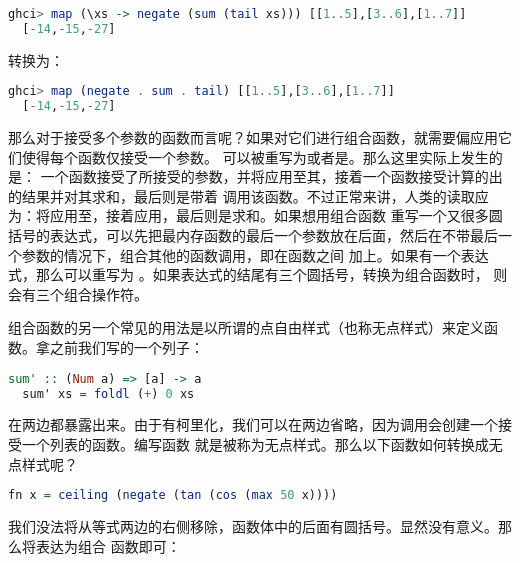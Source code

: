 \documentclass[./main.tex]{subfiles}
\begin{document}
\begin{lstlisting}[language=Haskell]
  ghci> map (\xs -> negate (sum (tail xs))) [[1..5],[3..6],[1..7]]
  [-14,-15,-27]
\end{lstlisting}

转换为：

\begin{lstlisting}[language=Haskell]
  ghci> map (negate . sum . tail) [[1..5],[3..6],[1..7]]
  [-14,-15,-27]
\end{lstlisting}

那么对于接受多个参数的函数而言呢？如果对它们进行组合函数，就需要偏应用它们使得每个函数仅接受一个参数。
可以被重写为或者是。那么这里实际上发生的是：
一个函数接受了所接受的参数，并将应用至其，接着一个函数接受计算的出的结果并对其求和，最后则是带着
调用该函数。不过正常来讲，人类的读取应为：将应用至，接着应用，最后则是求和。如果想用组合函数
重写一个又很多圆括号的表达式，可以先把最内存函数的最后一个参数放在\acode{\$}后面，然后在不带最后一个参数的情况下，组合其他的函数调用，即在函数之间
加上。如果有一个表达式，那么可以重写为
。如果表达式的结尾有三个圆括号，转换为组合函数时，
则会有三个组合操作符。

组合函数的另一个常见的用法是以所谓的点自由样式（也称无点样式）来定义函数。拿之前我们写的一个列子：

\begin{lstlisting}[language=Haskell]
  sum' :: (Num a) => [a] -> a
  sum' xs = foldl (+) 0 xs
\end{lstlisting}

在两边都暴露出来。由于有柯里化，我们可以在两边省略，因为调用会创建一个接受一个列表的函数。编写函数
就是被称为无点样式。那么以下函数如何转换成无点样式呢？

\begin{lstlisting}[language=Haskell]
  fn x = ceiling (negate (tan (cos (max 50 x))))
\end{lstlisting}

我们没法将从等式两边的右侧移除，函数体中的后面有圆括号。显然没有意义。那么将表达为组合
函数即可：
\end{document}
